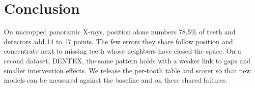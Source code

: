 \documentclass[runningheads]{llncs}
\begin{document}
\section{Conclusion}

On uncropped panoramic X-rays, position alone numbers 78.5\% of teeth and
detectors add 14 to 17 points. The few errors they share follow position and
concentrate next to missing teeth whose neighbors have closed the space. On a
second dataset, DENTEX, the same pattern holds with a weaker link to gaps and
smaller intervention effects. We release the per-tooth table and scorer so
that new models can be measured against the baseline and on these shared
failures.




\end{document}
